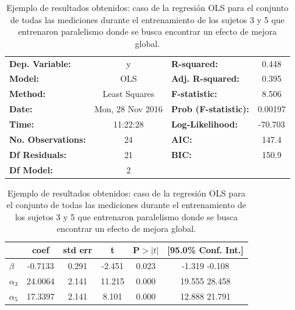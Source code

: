 \documentclass{article}
\begin{document}
    \begin {table}

    \begin{center}

    \caption{Ejemplo de resultados obtenidos: caso de la regresión OLS para el conjunto de todas las mediciones durante el entrenamiento de los sujetos 3 y 5 que entrenaron paralelismo donde se busca encontrar un efecto de mejora global.}
    \label{tabla:entrenamientoGlobalParalelismo}

    \vspace{0.3in}
    \begin{tabular}{lclc}
    \toprule
    \textbf{Dep. Variable:}    &        y         & \textbf{  R-squared:         } &     0.448   \\
    \textbf{Model:}            &       OLS        & \textbf{  Adj. R-squared:    } &     0.395   \\
    \textbf{Method:}           &  Least Squares   & \textbf{  F-statistic:       } &     8.506   \\
    \textbf{Date:}             & Mon, 28 Nov 2016 & \textbf{  Prob (F-statistic):} &  0.00197    \\
    \textbf{Time:}             &     11:22:28     & \textbf{  Log-Likelihood:    } &   -70.703   \\
    \textbf{No. Observations:} &          24      & \textbf{  AIC:               } &     147.4   \\
    \textbf{Df Residuals:}     &          21      & \textbf{  BIC:               } &     150.9   \\
    \textbf{Df Model:}         &           2      & \textbf{                     } &             \\
    \bottomrule
    \end{tabular}

    \begin{tabular}{lccccc}
                & \textbf{coef} & \textbf{std err} & \textbf{t} & \textbf{P$>|t|$} & \textbf{[95.0\% Conf. Int.]}  \\
    \midrule
    $\beta$ &      -0.7133  &        0.291     &    -2.451  &         0.023        &        -1.319    -0.108       \\
    $\alpha_{3}$ &      24.0064  &        2.141     &    11.215  &         0.000        &        19.555    28.458       \\
    $\alpha_{5}$&      17.3397  &        2.141     &     8.101  &         0.000        &        12.888    21.791       \\
    \bottomrule
    \end{tabular}
    

\end{center}
\end{table}
\end{document}
